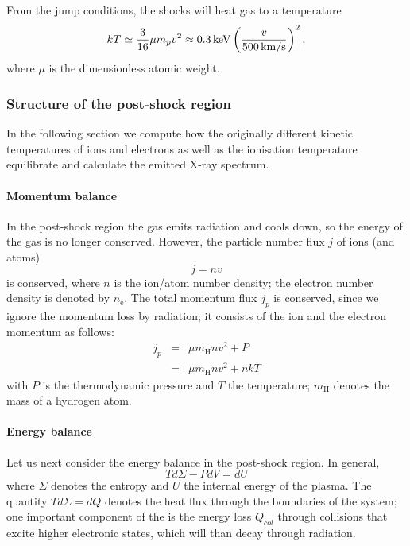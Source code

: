 From the jump conditions, the shocks will heat gas to a temperature
$$
kT \simeq \frac{3}{16}\mu m_p v^{2} \approx 0.3\,{\rm keV}\left(\frac{v}{500\,{\rm km/s}}\right)^{2},
\label{eqn:Tshock}
$$
where $\mu$ is the dimensionless atomic weight.

\subsubsection{Structure of the post-shock region}

In the following section we compute how the originally different kinetic temperatures of ions and electrons as well as the ionisation temperature
equilibrate and calculate the emitted X-ray spectrum.

\paragraph{Momentum balance}\label{hydrodyn}

In the post-shock region the gas emits radiation and cools down, so the energy of the gas is no longer conserved.  However, the particle number flux $j$ of ions (and atoms) 
\begin{equation}j=nv\label{j_n}\end{equation}
is conserved, where $n$ is the ion/atom number density; the electron number density is denoted by $n_{\mathrm{e}}$. The total momentum flux $j_p$ is conserved, since we ignore the momentum loss by radiation; it consists of the ion and the electron momentum as follows:
\begin{eqnarray}  
j_p&=&\mu m_{\mathrm{H}} n v^2+P \nonumber \\
   &=&\mu m_{\mathrm{H}} n v^2+nkT \label{j_p}
\end{eqnarray}
with $P$ is the thermodynamic pressure and $T$ the temperature; $m_{\mathrm{H}}$ denotes the mass of a hydrogen atom.

\paragraph{Energy balance}
\label{sect:energybalance}

Let us next consider the energy balance in the post-shock region. In general,  
\begin{equation} \label{tsminuspdvisdu} T d\Sigma -P dV=dU \end{equation}
where $\Sigma$ denotes the entropy and $U$ the internal energy of the plasma. The quantity $T d\Sigma=dQ$ denotes the heat flux through the boundaries of the system; one important component of the is the energy loss $Q_{col}$ through collisions that excite higher electronic states, which will than decay through radiation. 

